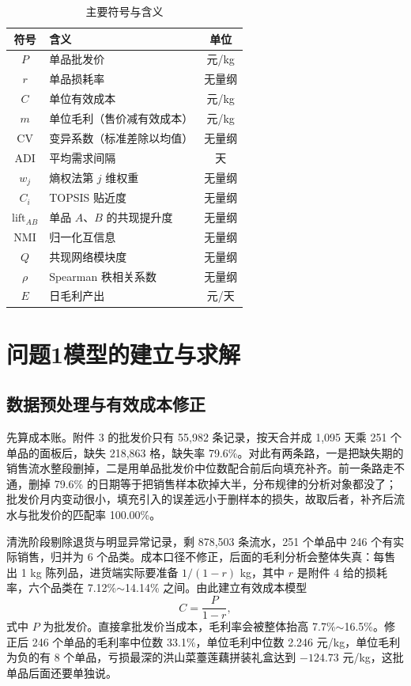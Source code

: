 \documentclass[zihao=-4,a4paper]{ctexart}
\begin{document}
\begin{table}[H]
\centering
\caption{主要符号与含义}
\begin{tabular}{clc}
\toprule
符号 & 含义 & 单位 \\
\midrule
$P$ & 单品批发价 & 元/kg \\
$r$ & 单品损耗率 & 无量纲 \\
$C$ & 单位有效成本 & 元/kg \\
$m$ & 单位毛利（售价减有效成本） & 元/kg \\
$\mathrm{CV}$ & 变异系数（标准差除以均值） & 无量纲 \\
$\mathrm{ADI}$ & 平均需求间隔 & 天 \\
$w_j$ & 熵权法第 $j$ 维权重 & 无量纲 \\
$C_i$ & TOPSIS 贴近度 & 无量纲 \\
$\mathrm{lift}_{AB}$ & 单品 $A$、$B$ 的共现提升度 & 无量纲 \\
$\mathrm{NMI}$ & 归一化互信息 & 无量纲 \\
$Q$ & 共现网络模块度 & 无量纲 \\
$\rho$ & Spearman 秩相关系数 & 无量纲 \\
$E$ & 日毛利产出 & 元/天 \\
\bottomrule
\end{tabular}
\end{table}

\section{问题1模型的建立与求解}

\subsection{数据预处理与有效成本修正}

先算成本账。附件 3 的批发价只有 55,982 条记录，按天合并成 1,095 天乘 251 个单品的面板后，缺失 218,863 格，缺失率 79.6\%。对此有两条路，一是把缺失期的销售流水整段删掉，二是用单品批发价中位数配合前后向填充补齐。前一条路走不通，删掉 79.6\% 的日期等于把销售样本砍掉大半，分布规律的分析对象都没了；批发价月内变动很小，填充引入的误差远小于删样本的损失，故取后者，补齐后流水与批发价的匹配率 100.00\%。

清洗阶段剔除退货与明显异常记录，剩 878,503 条流水，251 个单品中 246 个有实际销售，归并为 6 个品类。成本口径不修正，后面的毛利分析会整体失真：每售出 1 kg 陈列品，进货端实际要准备 $1/(1-r)$ kg，其中 $r$ 是附件 4 给的损耗率，六个品类在 7.12\%$\sim$14.14\% 之间。由此建立有效成本模型
\begin{equation}
C = \frac{P}{1-r},
\end{equation}
式中 $P$ 为批发价。直接拿批发价当成本，毛利率会被整体抬高 7.7\%$\sim$16.5\%。修正后 246 个单品的毛利率中位数 33.1\%，单位毛利中位数 2.246 元/kg，单位毛利为负的有 8 个单品，亏损最深的洪山菜薹莲藕拼装礼盒达到 $-124.73$ 元/kg，这批单品后面还要单独说。
\end{document}
